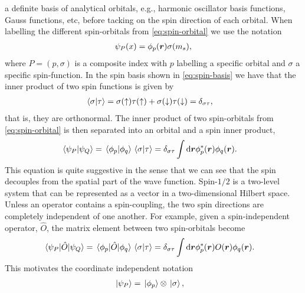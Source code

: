        a definite basis of analytical orbitals, e.g., harmonic oscillator basis
        functions, Gauss functions, etc, before tacking on the spin direction of
        each orbital.
        When labelling the different spin-orbitals from
        \autoref{eq:spin-orbital} we use the notation
        \begin{align}
            \psi_P(x) = \phi_p(\boldsymbol{r})\sigma(m_s),
        \end{align}
        where $P = (p, \sigma)$ is a composite index with $p$ labelling a
        specific orbital and $\sigma$ a specific spin-function.
        In the spin basis shown in \autoref{eq:spin-basis} we have that the
        inner product of two spin functions is given by
        \begin{align}
            \braket*{\sigma}{\tau}
            &=
            \sigma(\uparrow)\tau(\uparrow)
            + \sigma(\downarrow)\tau(\downarrow)
            = \delta_{\sigma\tau},
        \end{align}
        that is, they are orthonormal.
        The inner product of two spin-orbitals from \autoref{eq:spin-orbital} is
        then separated into an orbital and a spin inner product,
        \begin{align}
            \braket*{\psi_P}{\psi_Q}
            &= \braket*{\phi_p}{\phi_q}\braket*{\sigma}{\tau}
            = \delta_{\sigma\tau}
            \int\dd\boldsymbol{r}\phi^{*}_{p}(\boldsymbol{r})\phi_{q}(\boldsymbol{r}).
            \label{eq:inner-spin-orbital}
        \end{align}
        This equation is quite suggestive in the sense that we can see that the
        spin decouples from the spatial part of the wave function.
        Spin-$1/2$ is a two-level system that can be represented as a vector
        in a two-dimensional Hilbert space.
        Unless an operator contains a spin-coupling, the two spin directions are
        completely independent of one another.
        For example, given a spin-independent operator, $\hat{O}$, the
        matrix element between two spin-orbitals become
        \begin{align}
            \mel*{\psi_P}{\hat{O}}{\psi_Q}
            &= \mel*{\phi_p}{\hat{O}}{\phi_q}\braket*{\sigma}{\tau}
            = \delta_{\sigma\tau}
            \int\dd\boldsymbol{r}\phi^{*}_{p}(\boldsymbol{r})O(\boldsymbol{r})\phi_q(\boldsymbol{r}).
            \label{eq:example-spin-decoupling}
        \end{align}
        This motivates the coordinate independent notation
        \begin{align}
            \ket*{\psi_P}
            &= \ket*{\phi_p}\otimes\ket*{\sigma},
        \end{align}
